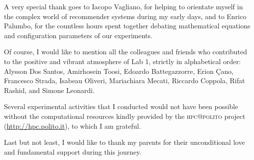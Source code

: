A very special thank goes to Iacopo Vagliano, for helping to orientate myself in the complex world of recommender systems during my early days, and to Enrico Palumbo, for the countless hours spent together debating mathematical equations and configuration parameters of our experiments.

Of course, I would like to mention all the colleagues and friends who contributed to the positive and vibrant atmosphere of Lab 1, strictly in alphabetical order: Alysson Dos Santos, Amirhosein Toosi, Edoardo Battegazzorre, Erion {\c C}ano, Francesco Strada, Isabeau Oliveri, Mariachiara Mecati, Riccardo Coppola, Rifat Rashid, and Simone Leonardi.

Several experimental activities that I conducted would not have been possible without the computational resources kindly provided by the \textsc{hpc@polito} project (\url{http://hpc.polito.it}), to which I am grateful.

Last but not least, I would like to thank my parents for their unconditional love and fundamental support during this journey.

\tablespagetrue\figurespagetrue
\allcontents


\renewcommand{\nomname}{Glossary}
\renewcommand\nomgroup[1]{}
\printnomenclature

\mainmatter












\appendix



\backmatter

\sloppy
\printbibliography[heading=bibintoc]

\printindex

